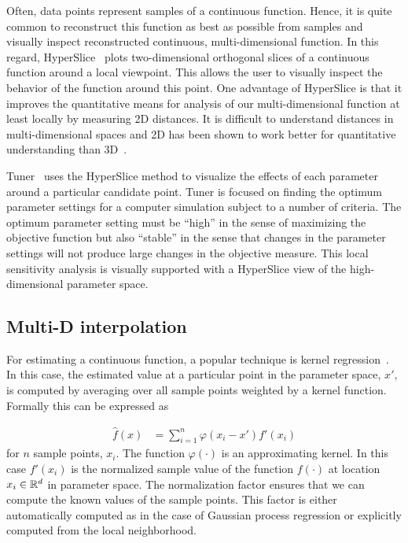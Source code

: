 Often, data points represent samples of a continuous function. Hence, it
is quite common to reconstruct this function as best as possible from samples
and visually inspect reconstructed continuous, multi-dimensional function.
In this regard, HyperSlice~\cite{Wijk:1993} plots
two-dimensional orthogonal slices of a continuous function around a local
viewpoint. This allows the user to visually inspect the behavior of the
function around this point. One advantage of HyperSlice is that it improves
the quantitative means for analysis of our multi-dimensional function at 
least locally
by measuring 2D distances. It is difficult to understand distances in
multi-dimensional spaces and 2D has been shown to work better for quantitative
understanding than 3D~\cite{Tory:2006}.

Tuner~\cite{Torsney-Weir:2011} uses the HyperSlice method to
visualize the effects of each parameter around a particular candidate point.
Tuner is focused on finding the optimum parameter settings for a computer
simulation subject to a number of criteria. The optimum parameter setting must
be ``high'' in the sense of maximizing the objective function but also
``stable'' in the sense that changes in the parameter settings will not
produce large changes in the objective measure. This local sensitivity
analysis is visually supported with a HyperSlice view of the high-dimensional
parameter space.

\subsection{Multi-D interpolation}
\label{multi-dinterpolation}

For estimating a continuous function, a popular technique is 
kernel regression~\cite{Simonoff:1996}. In this case, the estimated value at a
particular point in the parameter space, $x'$, is computed by averaging over
all sample points weighted by a kernel function. Formally this can be
expressed as

\begin{align}
 \hat{f}(x) &= \sum_{i=1}^n \varphi(x_i -x') f'(x_i)
 \label{eq:kernel_regression}
\end{align}
for $n$ sample points, $x_i$. The function $\varphi(\cdot)$ is an approximating
kernel. In this case $f'(x_i)$ is the normalized sample value 
of the function $f(\cdot)$ at 
location $x_i \in \mathbb{R}^d$
in parameter space. The normalization factor ensures that we can
compute the known values of the sample points.
This factor is either automatically 
computed as in the case of Gaussian process regression or explicitly computed 
from the local neighborhood. 


